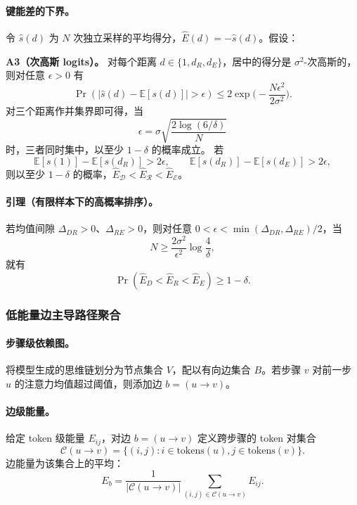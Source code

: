 \paragraph{键能差的下界。}
令 $\widehat{s}(d)$ 为 $N$ 次独立采样的平均得分，$\widehat{E}(d)=-\widehat{s}(d)$。假设：

\textbf{A3（次高斯 logits）。}
对每个距离 $d\in\{1,d_R,d_E\}$，居中的得分是 $\sigma^2$-次高斯的，则对任意 $\epsilon>0$ 有
\begin{equation}
\Pr(|\widehat{s}(d)-\mathbb{E}[s(d)]|>\epsilon)\le 2\exp\big(-\frac{N\epsilon^2}{2\sigma^2}\big).
\end{equation}
对三个距离作并集界即可得，当
\begin{equation}
\epsilon=\sigma\sqrt{\frac{2\log(6/\delta)}{N}}
\end{equation}
时，三者同时集中，以至少 $1-\delta$ 的概率成立。
若
\begin{equation}
\mathbb{E}[s(1)]-\mathbb{E}[s(d_R)] > 2\epsilon,\qquad
\mathbb{E}[s(d_R)]-\mathbb{E}[s(d_E)] > 2\epsilon,
\end{equation}
则以至少 $1-\delta$ 的概率，$\widehat{E}_{\mathcal{D}} < \widehat{E}_{\mathcal{R}} < \widehat{E}_{\mathcal{E}}$。

\paragraph{引理（有限样本下的高概率排序）。}
若均值间隙 $\Delta_{DR}>0$、$\Delta_{RE}>0$，则对任意 $0<\epsilon<\min(\Delta_{DR},\Delta_{RE})/2$，当
\begin{equation}
N \ge \frac{2\sigma^2}{\epsilon^2}\log \frac{4}{\delta},
\end{equation}
就有
\begin{equation}
\Pr(\hat{E}_D < \hat{E}_R < \hat{E}_E) \ge 1-\delta.
\end{equation}


\subsubsection{低能量边主导路径聚合}
\paragraph{步骤级依赖图。}
将模型生成的思维链划分为节点集合 \(V\)，配以有向边集合 \(B\)。若步骤 $v$ 对前一步 $u$ 的注意力均值超过阈值，则添加边 $b=(u\to v)$。

\paragraph{边级能量。}
给定 token 级能量 $E_{ij}$，对边 $b=(u\to v)$ 定义跨步骤的 token 对集合
\begin{equation}
\mathcal{C}(u\to v)=\{(i,j): i\in \text{tokens}(u), j\in \text{tokens}(v)\}.
\end{equation}
边能量为该集合上的平均：
\begin{equation}
E_b = \frac{1}{|\mathcal{C}(u\to v)|}\sum_{(i,j)\in \mathcal{C}(u\to v)} E_{ij}.
\end{equation}

